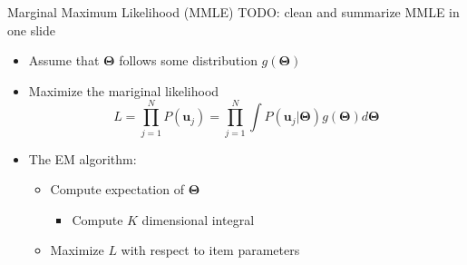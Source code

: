 \documentclass{beamer}
\newcommand{\vect}[1]{\boldsymbol{#1}}
\theoremstyle{definition}
\begin{document}
%

\begin{frame}{Marginal Maximum Likelihood (MMLE)}
  TODO: clean and summarize MMLE in one slide %
\begin{itemize}
  \item Assume that $\vect \Theta$ follows some distribution $g(\vect \Theta)$
  \item Maximize the mariginal likelihood 
  \[L = \prod_{j=1}^N P(\vect u_j) = \prod_{j=1}^N \int P(\vect u_j | \vect \Theta) g(\vect \Theta) d\vect \Theta\]
  \item<2-> The EM algorithm:
    \begin{itemize}
      \item Compute expectation of $\vect \Theta$
        \begin{itemize}
          \item Compute $K$ dimensional integral
        \end{itemize}
      \item Maximize $L$ with respect to item parameters
    \end{itemize}
\end{itemize}
\end{frame}
\end{document}
